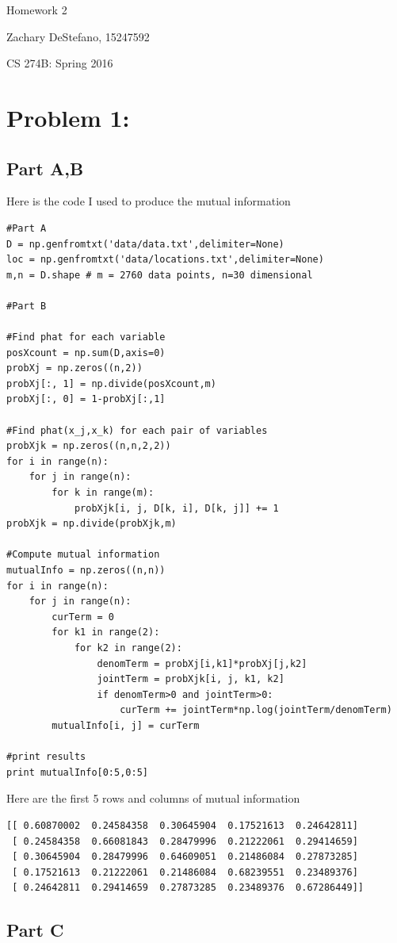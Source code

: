 \documentclass[twoside,11pt]{article}
\theoremstyle{definition}
\begin{document}
\centerline{\Large Homework 2}
\centerline{Zachary DeStefano, 15247592}
\centerline{CS 274B: Spring 2016}

\section*{Problem 1: }

\subsection*{Part A,B}

Here is the code I used to produce the mutual information
\begin{lstlisting}
#Part A
D = np.genfromtxt('data/data.txt',delimiter=None)
loc = np.genfromtxt('data/locations.txt',delimiter=None)
m,n = D.shape # m = 2760 data points, n=30 dimensional

#Part B

#Find phat for each variable
posXcount = np.sum(D,axis=0)
probXj = np.zeros((n,2))
probXj[:, 1] = np.divide(posXcount,m)
probXj[:, 0] = 1-probXj[:,1]

#Find phat(x_j,x_k) for each pair of variables
probXjk = np.zeros((n,n,2,2))
for i in range(n):
    for j in range(n):
        for k in range(m):
            probXjk[i, j, D[k, i], D[k, j]] += 1
probXjk = np.divide(probXjk,m)

#Compute mutual information
mutualInfo = np.zeros((n,n))
for i in range(n):
    for j in range(n):
        curTerm = 0
        for k1 in range(2):
            for k2 in range(2):
                denomTerm = probXj[i,k1]*probXj[j,k2]
                jointTerm = probXjk[i, j, k1, k2]
                if denomTerm>0 and jointTerm>0:
                    curTerm += jointTerm*np.log(jointTerm/denomTerm)
        mutualInfo[i, j] = curTerm

#print results
print mutualInfo[0:5,0:5]
\end{lstlisting}

Here are the first 5 rows and columns of mutual information
\begin{lstlisting}
[[ 0.60870002  0.24584358  0.30645904  0.17521613  0.24642811]
 [ 0.24584358  0.66081843  0.28479996  0.21222061  0.29414659]
 [ 0.30645904  0.28479996  0.64609051  0.21486084  0.27873285]
 [ 0.17521613  0.21222061  0.21486084  0.68239551  0.23489376]
 [ 0.24642811  0.29414659  0.27873285  0.23489376  0.67286449]]
\end{lstlisting}
\newpage
\subsection*{Part C}
\end{document}
